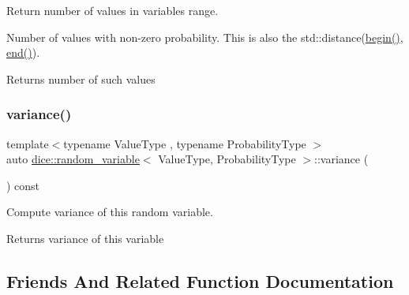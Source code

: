 Return number of values in variable\textquotesingle{}s range. 

Number of values with non-\/zero probability. This is also the std\+::distance(\mbox{\hyperlink{classdice_1_1random__variable_ad65ca036dd0c61483c888579b2d912fa}{begin()}}, \mbox{\hyperlink{classdice_1_1random__variable_a82f50939d82419d9f86901b6997ca8fe}{end()}}).

\begin{DoxyReturn}{Returns}
number of such values 
\end{DoxyReturn}
\mbox{\label{classdice_1_1random__variable_ae709a9985d1e722629fc13c26f405e61}} 
\subsubsection{\texorpdfstring{variance()}{variance()}}
{\footnotesize\ttfamily template$<$typename Value\+Type , typename Probability\+Type $>$ \\
auto \mbox{\hyperlink{classdice_1_1random__variable}{dice\+::random\+\_\+variable}}$<$ Value\+Type, Probability\+Type $>$\+::variance (\begin{DoxyParamCaption}{ }\end{DoxyParamCaption}) const\hspace{0.3cm}{\ttfamily [inline]}}



Compute variance of this random variable. 

\begin{DoxyReturn}{Returns}
variance of this variable 
\end{DoxyReturn}


\subsection{Friends And Related Function Documentation}
\mbox{\label{classdice_1_1random__variable_a1ee237915048ab90f60508a75ba39c40}} 
